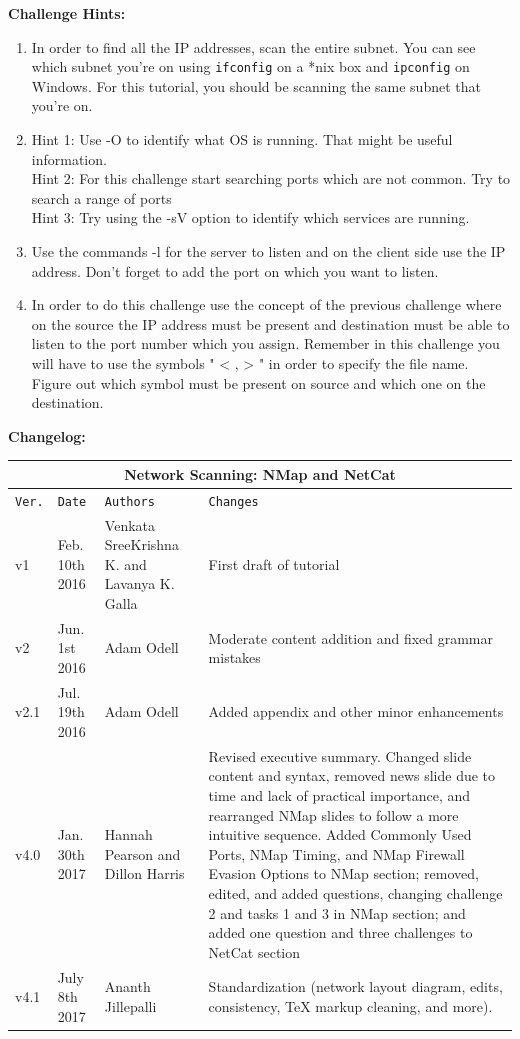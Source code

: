 \documentclass[12pt]{article}
\begin{document}
\noindent
\textbf{Challenge Hints:}
\begin{enumerate}
\item In order to find all the IP addresses, scan the entire subnet. You can see which subnet you're on using \texttt{ifconfig} on a *nix box and \texttt{ipconfig} on Windows. For this tutorial, you should be scanning the same subnet that you're on.

\item Hint 1: Use -O to identify what OS is running. That might be useful information.\\
Hint 2: For this challenge start searching ports which are not common. Try to search a range of ports\\
Hint 3: Try using the -sV option to identify which services are running.\\

   \item Use the commands -l for the server to listen and on the client side use the IP address. Don't forget to add the port on which you want to listen.
   \item In order to do this challenge use the concept of the previous challenge where on the source the IP address must be present and destination must be able to listen to the port number which you assign. Remember in this challenge you will have to use the symbols " < , > " in order to specify the file name. Figure out which symbol must be present on source and which one on the destination.
\end{enumerate}

\noindent
\textbf{Changelog:}
\label{changelog}
\vspace{6mm}


\begin{tabular}{ |p{1cm}|p{3cm}|p{4cm}|p{6cm}| }
\hline
\multicolumn{4}{|c|}{Network Scanning:  NMap and NetCat} \\ \hline
\texttt{Ver.} & \texttt{Date} & \texttt{Authors} & \texttt{Changes} \\ \hline
v1 & Feb. 10th 2016 & Venkata SreeKrishna K. and Lavanya K. Galla & First draft of tutorial \\ \hline
v2 & Jun. 1st 2016 & Adam Odell & Moderate content addition and fixed grammar mistakes \\ \hline
v2.1 & Jul. 19th 2016 & Adam Odell & Added appendix and other minor enhancements \\ \hline
v4.0 & Jan. 30th 2017 & Hannah Pearson and Dillon Harris & Revised executive summary. Changed slide content and syntax, removed news slide due to time and lack of practical importance, and rearranged  NMap slides to follow a more intuitive sequence. Added Commonly Used Ports,  NMap Timing, and  NMap Firewall Evasion Options to  NMap section; removed, edited, and added questions, changing challenge 2 and tasks 1 and 3 in  NMap section; and added one question and three challenges to NetCat section  \\ \hline
v4.1 & July 8th 2017 & Ananth Jillepalli & Standardization (network layout diagram, edits, consistency, TeX markup cleaning, and more). \\ \hline
\end{tabular}
\end{document}
